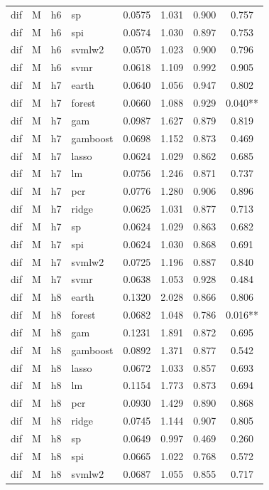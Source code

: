 \begin{ThreePartTable}
\begin{longtable}[t]{llclcccc}
dif & M & h6 & sp & 0.0575 & 1.031 & 0.900 & 0.757\\
dif & M & h6 & spi & 0.0574 & 1.030 & 0.897 & 0.753\\
dif & M & h6 & svmlw2 & 0.0570 & 1.023 & 0.900 & 0.796\\
dif & M & h6 & svmr & 0.0618 & 1.109 & 0.992 & 0.905\\
\addlinespace
dif & M & h7 & earth & 0.0640 & 1.056 & 0.947 & 0.802\\
dif & M & h7 & forest & 0.0660 & 1.088 & 0.929 & 0.040**\\
dif & M & h7 & gam & 0.0987 & 1.627 & 0.879 & 0.819\\
dif & M & h7 & gamboost & 0.0698 & 1.152 & 0.873 & 0.469\\
dif & M & h7 & lasso & 0.0624 & 1.029 & 0.862 & 0.685\\
dif & M & h7 & lm & 0.0756 & 1.246 & 0.871 & 0.737\\
dif & M & h7 & pcr & 0.0776 & 1.280 & 0.906 & 0.896\\
dif & M & h7 & ridge & 0.0625 & 1.031 & 0.877 & 0.713\\
dif & M & h7 & sp & 0.0624 & 1.029 & 0.863 & 0.682\\
dif & M & h7 & spi & 0.0624 & 1.030 & 0.868 & 0.691\\
dif & M & h7 & svmlw2 & 0.0725 & 1.196 & 0.887 & 0.840\\
dif & M & h7 & svmr & 0.0638 & 1.053 & 0.928 & 0.484\\
\addlinespace
dif & M & h8 & earth & 0.1320 & 2.028 & 0.866 & 0.806\\
dif & M & h8 & forest & 0.0682 & 1.048 & 0.786 & 0.016**\\
dif & M & h8 & gam & 0.1231 & 1.891 & 0.872 & 0.695\\
dif & M & h8 & gamboost & 0.0892 & 1.371 & 0.877 & 0.542\\
dif & M & h8 & lasso & 0.0672 & 1.033 & 0.857 & 0.693\\
dif & M & h8 & lm & 0.1154 & 1.773 & 0.873 & 0.694\\
dif & M & h8 & pcr & 0.0930 & 1.429 & 0.890 & 0.868\\
dif & M & h8 & ridge & 0.0745 & 1.144 & 0.907 & 0.805\\
dif & M & h8 & sp & 0.0649 & 0.997 & 0.469 & 0.260\\
dif & M & h8 & spi & 0.0665 & 1.022 & 0.768 & 0.572\\
dif & M & h8 & svmlw2 & 0.0687 & 1.055 & 0.855 & 0.717\\

\end{longtable}
\end{ThreePartTable}
